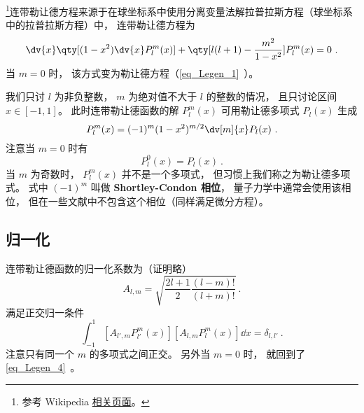 

\footnote{参考 Wikipedia \href{https://en.wikipedia.org/wiki/Associated_Legendre_polynomials}{相关页面}。}连带勒让德方程来源于在球坐标系中使用分离变量法解拉普拉斯方程（球坐标系中的拉普拉斯方程）中， 连带勒让德方程为
\begin{equation}
\dv{x} \qty[(1-x^2)\dv{x} P_l^m(x)] + \qty[l(l+1) - \frac{m^2}{1-x^2}]P_l^m(x) = 0~.
\end{equation}
当 $m = 0$ 时， 该方式变为勒让德方程（\autoref{eq_Legen_1}~）。

我们只讨 $l$ 为非负整数， $m$ 为绝对值不大于 $l$ 的整数的情况， 且只讨论区间 $x\in [-1,1]$。 此时连带勒让德函数的解 $P_l^m(x)$ 可用勒让德多项式 $P_l(x)$ 生成
\begin{equation}\label{eq_AsLgdr_1}
P_l^m(x) = (-1)^m (1 - x^2)^{m/2} \dv[m]{x} P_l(x)~.
\end{equation}
注意当 $m = 0$ 时有
\begin{equation}
P_l^0(x) = P_l(x)~.
\end{equation}
当 $m$ 为奇数时， $P_l^m(x)$ 并不是一个多项式， 但习惯上我们称之为勒让德多项式。 式中 $(-1)^m$ 叫做 \textbf{Shortley-Condon 相位}， 量子力学中通常会使用该相位， 但在一些文献中不包含这个相位（同样满足微分方程）。

\subsection{归一化}
连带勒让德函数的归一化系数为（证明略）
\begin{equation}\label{eq_AsLgdr_3}
A_{l,m} = \sqrt{\frac{2l+1}{2}\frac{(l-m)!}{(l+m)!}}~.
\end{equation}
满足正交归一条件
\begin{equation}\label{eq_AsLgdr_4}
\int_{-1}^1 [A_{l',m} P_{l'}^{m}(x)] [A_{l,m} P_l^{m}(x)] \dd{x} = \delta_{l,l'}~.
\end{equation}
注意只有同一个 $m$ 的多项式之间正交。 另外当 $m = 0$ 时， 就回到了\autoref{eq_Legen_4}~。

